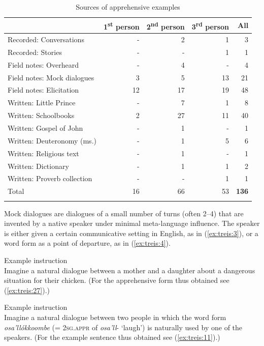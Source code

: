 \documentclass[output=paper,colorlinks,citecolor=brown,]{langscibook}
\begin{document}
\begin{table}
\caption{Sources of apprehensive examples}
\label{tab:treis:1}
 \begin{tabular}{lrrrr}
  \lsptoprule
            & 1\textsuperscript{st} person & 2\textsuperscript{nd} person & 3\textsuperscript{rd} person & All\\
  \midrule
Recorded: Conversations & - & 2 & 1 & 3\\
Recorded: Stories & - & - & 1 & 1\\
Field notes: Overheard & - & 4 & - & 4\\
Field notes: Mock dialogues & 3 & 5 & 13 & 21\\
Field notes: Elicitation & 12 & 17 & 19 & 48\\ 
Written: Little Prince & - & 7 & 1 & 8\\
Written: Schoolbooks & 2 & 27 & 11 & 40\\
Written: Gospel of John & - & 1 & - & 1\\
Written: Deuteronomy (ms.) & - & 1 & 5 & 6\\
Written: Religious text & - & 1 & - & 1\\
Written: Dictionary & - & 1 & 1 & 2\\
Written: Proverb collection & - & - & 1 & 1\\
  \midrule
  Total & 16 & 66 & 53 & \textbf{136}\\
  \lspbottomrule
 \end{tabular}
\end{table}


Mock dialogues are dialogues of a small number of turns (often 2--4) that are invented by a native speaker under minimal meta-language influence. The speaker is either given a certain communicative setting in English, as in (\ref{ex:treis:3}), or a  word form as a point of departure, as in (\ref{ex:treis:4}).

\ea\label{ex:treis:3} \textnormal{Example instruction}\\
\textnormal{Imagine a natural dialogue between a mother and a daughter about a dangerous situation for their chicken. (For the apprehensive form thus obtained see (\ref{ex:treis:27}).)}
\z

\ea\label{ex:treis:4} \textnormal{Example instruction}\\
\textnormal{Imagine a natural dialogue between two people in which the word form \textit{osa'llókkoombe} (= \textsc{2sg.appr} of \textit{osa'll}- `laugh') is naturally used by one of the speakers. (For the example sentence thus obtained see (\ref{ex:treis:11}).)}
\z
\end{document}
